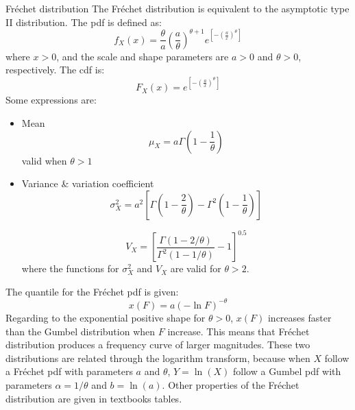\documentclass[8pt]{beamer}
\renewcommand{\emph}[1]{\textcolor{myorange}{#1}}
\begin{document}
\begin{frame}{Fr\'echet distribution}
    The \alert{Fr\'echet distribution} is equivalent to the asymptotic type II distribution. The \emph{pdf} is defined as:
                \vspace{-5pt}
    \[
        f_X (x) = \frac{\theta}{a} \left( \frac{a}{\theta} \right)^{\theta +1} e^{\left[ - \left(\frac{a}{x}\right)^{\theta} \right]}
    \]
    where $x>0$, and the scale and  shape parameters are  $a>0$ and $\theta >0$, respectively. The \emph{cdf} is:
    \[
        F_X (x) = e^{\left[ - \left( \frac{a}{x} \right)^{\theta} \right]}
        \]
    Some expressions are:
        \begin{itemize}
            \item \emph{Mean}
                \vspace{-5pt}
                \[
                    \mu_X = a \Gamma \left( 1 - \frac{1}{\theta} \right)
                \]
                valid when $\theta > 1$

            \item \emph{Variance \& variation coefficient}
                \vspace{-5pt}
                \[
                    \sigma_X^2 = a^2 \left[ \Gamma \left(1- \frac{2}{\theta} \right) - \Gamma^2 \left( 1- \frac{1}{\theta} \right) \right] 
                \]

                \[
                    V_X = \left[ \frac{\Gamma (1-2/\theta)}{\Gamma^2 (1-1/\theta)} -1\right]^{0.5} 
                \]
                where the functions for $\sigma_X^2$ and $V_X$  are valid for $\theta > 2$.         
        \end{itemize}
The quantile for the \emph{Fr\'echet pdf} is given:
                \vspace{-5pt}
                \[
                    x(F) = a (-\ln F )^{-\theta}
                \]
                Regarding  to the exponential positive shape for $\theta > 0$, $x(F)$ increases faster than the \emph{Gumbel distribution}  when $F$ increase. This means that \emph{Fr\'echet distribution} produces a frequency curve of larger magnitudes. These two distributions are related through the \emph{logarithm transform}, because when $X$ follow a \emph{Fr\'echet pdf} with parameters $a$ and $\theta$, $Y = \ln (X)$ follow a \emph{Gumbel pdf} with parameters $\alpha = 1/\theta$ and $b = \ln (a) $. Other properties of the \emph{Fr\'echet distribution} are given in textbooks tables. 

\end{frame}
\end{document}
